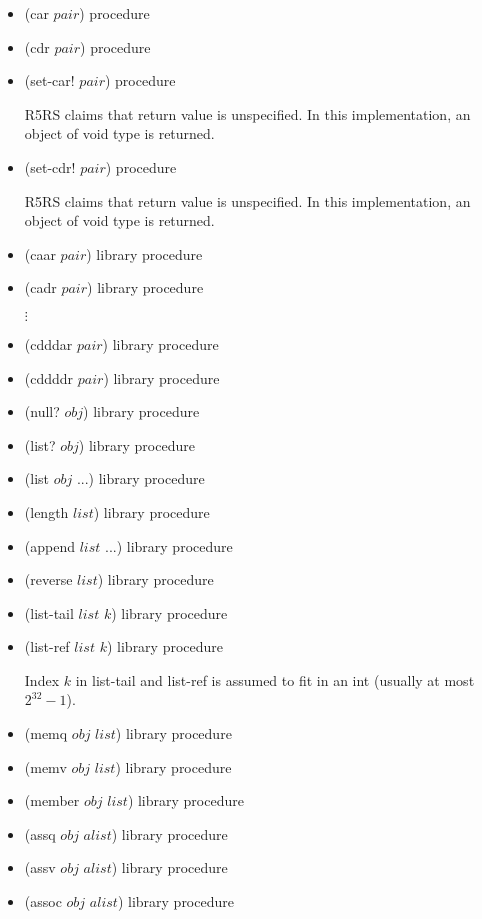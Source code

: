 \documentclass{article}
\begin{document}
\begin{itemize}
\begin{itemize}
		\item (car $pair$)	\hfill	procedure
		\item (cdr $pair$)	\hfill	procedure
		
		\item (set-car! $pair$)	\hfill	procedure
		
		R5RS claims that return value is unspecified. In this implementation, an object of void type is returned.
		
		\item (set-cdr! $pair$)	\hfill	procedure
		
		R5RS claims that return value is unspecified. In this implementation, an object of void type is returned.
		
		\item (caar $pair$)	\hfill	library procedure
		\item (cadr $pair$)	\hfill	library procedure
		
		\qquad $\vdots$
		
		\item (cdddar $pair$)	\hfill	library procedure		
		\item (cddddr $pair$)	\hfill	library procedure
				
		\item (null? $obj$)	\hfill	library procedure
		\item (list? $obj$)	\hfill	library procedure
		
		\item (list $obj$ ...)	\hfill	library procedure
		\item (length $list$)	\hfill	library procedure
		\item (append $list$ ...)	\hfill	library procedure
		\item (reverse $list$)	\hfill	library procedure
		\item (list-tail $list$ $k$)	\hfill	library procedure
		\item (list-ref $list$ $k$)	\hfill	library procedure
		
		Index $k$ in list-tail and list-ref is assumed to fit in an int (usually at most $2^{32}-1$).
				
		\item (memq $obj$ $list$)	\hfill	library procedure
		\item (memv $obj$ $list$)	\hfill	library procedure
		\item (member $obj$ $list$)	\hfill	library procedure
		
		\item (assq $obj$ $alist$)	\hfill	library procedure
		\item (assv $obj$ $alist$)	\hfill	library procedure
		\item (assoc $obj$ $alist$)	\hfill	library procedure
	\end{itemize}
	

\end{itemize}
\end{document}
